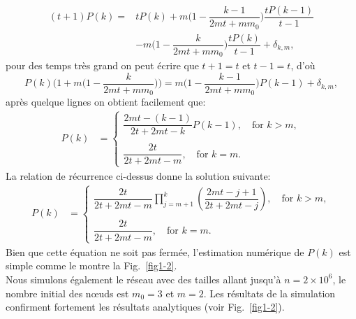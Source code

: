 \begin{equation}
\begin{aligned}
(t+1)P(k)= &tP(k)+m\big(1-\dfrac{k-1}{2mt+mm_0}\big)\dfrac{tP(k-1)}{t-1}\\
&-m\big(1-\dfrac{k}{2mt+mm_0}\big)\dfrac{tP(k)}{t-1} +\delta_{k,m},
\end{aligned}
\end{equation}
pour des temps très grand on peut écrire que $t+1=t$ et $t-1=t$, d'où
\begin{equation}
P(k)\big(1+m\big(1-\dfrac{k}{2mt+mm_0}\big)\big)=m\big(1-\dfrac{k-1}{2mt+mm_0}\big)P(k-1) +\delta_{k,m},
\end{equation}
après quelque lignes on obtient facilement que:
\begin{align}
P(k)&= 
\begin{cases}
\dfrac{2mt - (k-1)}{2t + 2mt - k}P(k-1), \quad \textrm{for }  k>m,\\
\\
\dfrac{2t}{2t + 2mt - m}, \quad\textrm{for }  k=m.
\end{cases}
\end{align}
La relation de récurrence ci-dessus donne la solution suivante:
\begin{align}
P(k)&= 
\begin{cases}
\dfrac{2t}{2t + 2mt - m}\prod^k_{j=m+1}\left( \dfrac{2mt -j + 1}{2t + 2mt - j}\right), \quad \textrm{for }  k>m,\\
\\
\dfrac{2t}{2t + 2mt - m}, \quad\textrm{for }  k=m.
\end{cases}
\label{eq4-2}
\end{align}
Bien que cette équation ne soit pas fermée, l'estimation numérique de $ P (k) $ est simple comme le montre la Fig.~\ref{fig1-2}. \\
Nous simulons également le réseau avec des tailles allant jusqu'à $n=2\times10^6$, le nombre initial des nœuds est $m_0=3$ et $m=2$. 
Les résultats de la simulation confirment fortement les résultats analytiques (voir Fig.~\ref{fig1-2}). 

